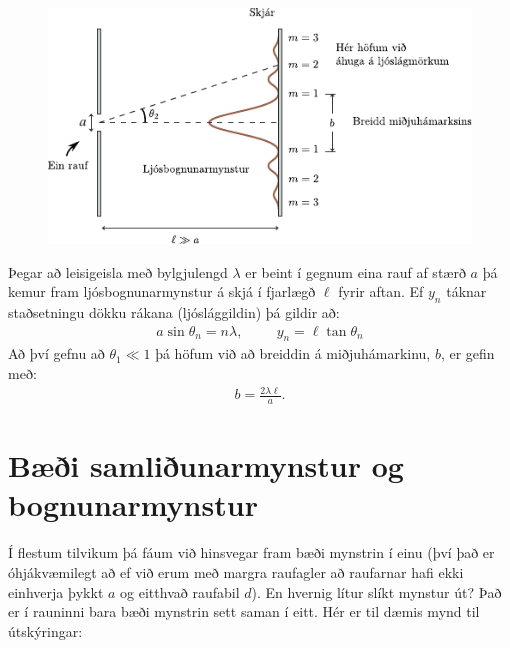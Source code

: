 \begin{figure}[H]
    \centering
    \includegraphics{figures/ljosbognun.pdf}
\end{figure}

\begin{tcolorbox}
Þegar að leisigeisla með bylgjulengd $\lambda$ er beint í gegnum eina rauf af stærð $a$ þá kemur fram ljósbognunarmynstur á skjá í fjarlægð $\ell$ fyrir aftan. Ef $y_n$ táknar staðsetningu dökku rákana (ljóslággildin) þá gildir að:
\begin{align*}
    a\sin\theta_n = n\lambda, \hspace{1cm} y_n = \ell \tan\theta_n
\end{align*}
Að því gefnu að $\theta_1 \ll 1$ þá höfum við að breiddin á miðjuhámarkinu, $b$, er gefin með:
\begin{align*}
    b = \frac{2\lambda \ell}{a}.
\end{align*}
\end{tcolorbox}


\section{Bæði samliðunarmynstur og bognunarmynstur}

Í flestum tilvikum þá fáum við hinsvegar fram bæði mynstrin í einu (því það er óhjákvæmilegt að ef við erum með margra raufagler að raufarnar hafi ekki einhverja þykkt $a$ og eitthvað raufabil $d$). En hvernig lítur slíkt mynstur út? Það er í rauninni bara bæði mynstrin sett saman í eitt. Hér er til dæmis mynd til útskýringar:

